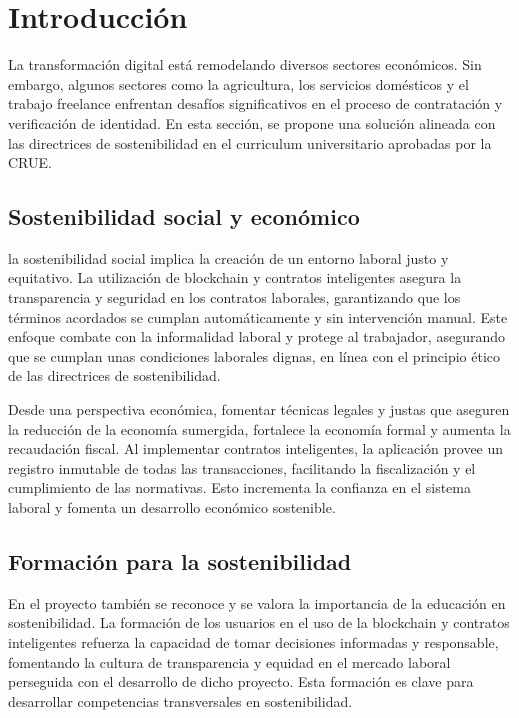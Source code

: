 
\section{Introducción}

La transformación digital está remodelando diversos sectores económicos. Sin embargo, algunos sectores como la agricultura, los servicios domésticos y el trabajo freelance enfrentan desafíos significativos en el proceso de contratación y verificación de identidad.
En esta sección, se propone una solución alineada con las directrices de sostenibilidad en el curriculum universitario aprobadas por la CRUE.


\subsection{Sostenibilidad social y económico}

la sostenibilidad social implica la creación de un entorno laboral justo y equitativo.
La utilización de blockchain y contratos inteligentes asegura la transparencia y seguridad en los contratos laborales, garantizando que los términos acordados se cumplan automáticamente y sin intervención manual. 
Este enfoque combate con la informalidad laboral y protege al trabajador, asegurando que se cumplan unas condiciones laborales dignas, en línea con el principio ético de las directrices de sostenibilidad. 

Desde una perspectiva económica, fomentar técnicas legales y justas que aseguren la reducción de la economía sumergida, fortalece la economía formal y aumenta la recaudación fiscal.
Al implementar contratos inteligentes, la aplicación provee un registro inmutable de todas las transacciones, facilitando la fiscalización y el cumplimiento de las normativas.
Esto incrementa la confianza en el sistema laboral y fomenta un desarrollo económico sostenible.


\subsection{Formación para la sostenibilidad}

En el proyecto también se reconoce y se valora la importancia de la educación en sostenibilidad. La formación de los usuarios en el uso de la blockchain y contratos inteligentes refuerza la capacidad de tomar decisiones informadas y responsable, fomentando la cultura de transparencia y equidad en el mercado laboral perseguida con el desarrollo de dicho proyecto.
Esta formación es clave para desarrollar competencias transversales en sostenibilidad.


